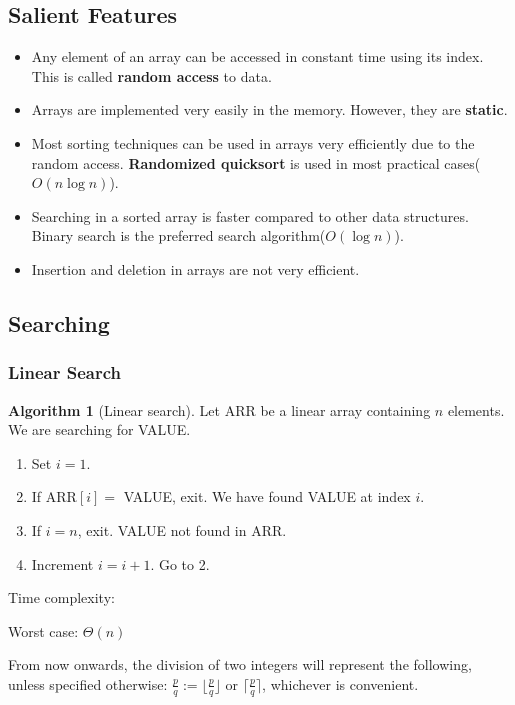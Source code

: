 \documentclass[10pt, a4paper]{extarticle}
\theoremstyle{definition}
\newtheorem{alg}{Algorithm}
\begin{document}
\subsection{Salient Features}
\begin{itemize}
	\item Any element of an array can be accessed in constant time using its index. This is called \textbf{random access} to data.
	\item Arrays are implemented very easily in the memory. However, they are \textbf{static}.
	\item Most sorting techniques can be used in arrays very efficiently due to the random access. \textbf{Randomized quicksort} is used in most practical cases($O(n\log n)$).
	\item Searching in a sorted array is faster compared to other data structures. Binary search is the preferred search algorithm($O(\log n)$).
	\item Insertion and deletion in arrays are not very efficient.
\end{itemize}

\subsection{Searching}
\subsubsection{Linear Search}
\begin{alg}[Linear search]
	Let ARR be a linear array containing $n$ elements. We are searching for VALUE.
	\begin{enumerate}
		\item Set $i=1$.
		\item If ARR$[i]=$ VALUE, exit. We have found VALUE at index $i$.
		\item If $i=n$, exit. VALUE not found in ARR.
		\item Increment $i=i+1$. Go to 2.
	\end{enumerate}
	Time complexity:

	Worst case: $\Theta(n)$
\end{alg}
From now onwards, the division of two integers will represent the following, unless specified otherwise: $\frac{p}{q}:=\lfloor\frac{p}{q}\rfloor$ or $\lceil\frac{p}{q}\rceil$, whichever is convenient.
\end{document}
